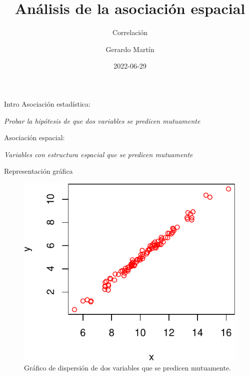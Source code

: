 \documentclass[
  11pt,
  ignorenonframetext,
]{beamer}
\title{Análisis de la asociación espacial}
\subtitle{Correlación}
\author{Gerardo Martín}
\date{2022-06-29}
\begin{document}
\frame{\titlepage}

\begin{frame}{Intro}
\protect\hypertarget{intro}{}
Asociación estadística:

\emph{Probar la hipótesis de que dos variables se predicen mutuamente}

Asociación espacial:

\emph{Variables con estructura espacial que se predicen mutuamente}
\end{frame}

\begin{frame}{Representación gráfica}
\protect\hypertarget{representaciuxf3n-gruxe1fica}{}
\begin{figure}

{\centering \includegraphics{Correlacion_files/figure-beamer/unnamed-chunk-1-1} 

}

\caption{Gráfico de dispersión de dos variables que se predicen mutuamente.}\label{fig:unnamed-chunk-1}
\end{figure}
\end{frame}
\end{document}
